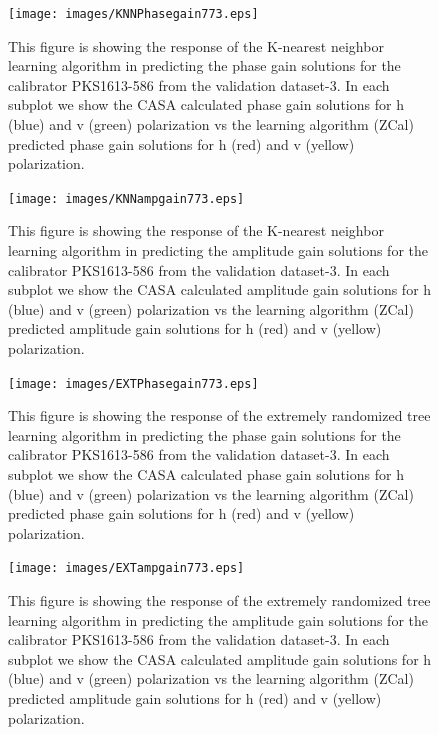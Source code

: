 \begin{figure}[H]
    \texttt{[image: images/KNNPhasegain773.eps]}
    \caption{This figure is showing the response of the K-nearest neighbor learning algorithm in predicting the phase gain solutions for the calibrator PKS1613-586 from the validation dataset-3. In each subplot we show the CASA calculated phase gain solutions for h (blue) and v (green) polarization vs the learning algorithm (ZCal) predicted phase gain solutions for h (red) and v (yellow) polarization.}
    \label{obs11}
\end{figure}

\begin{figure}[H]
    \texttt{[image: images/KNNampgain773.eps]}
    \caption{This figure is showing the response of the K-nearest neighbor learning algorithm in predicting the amplitude gain solutions for the calibrator PKS1613-586 from the validation dataset-3. In each subplot we show the CASA calculated amplitude gain solutions for h (blue) and v (green) polarization vs the learning algorithm (ZCal) predicted amplitude gain solutions for h (red) and v (yellow) polarization.}
     \label{ka3}
\end{figure}

\begin{figure}[H]
    \texttt{[image: images/EXTPhasegain773.eps]}
    \caption{This figure is showing the response of the extremely randomized tree learning algorithm in predicting the phase gain solutions for the calibrator PKS1613-586 from the validation dataset-3. In each subplot we show the CASA calculated phase gain solutions for h (blue) and v (green) polarization vs the learning algorithm (ZCal) predicted phase gain solutions for h (red) and v (yellow) polarization.}
    \label{obs12}
\end{figure}

\begin{figure}[H]
    \texttt{[image: images/EXTampgain773.eps]}
    \caption{This figure is showing the response of the extremely randomized tree learning algorithm in predicting the amplitude gain solutions for the calibrator PKS1613-586 from the validation dataset-3. In each subplot we show the CASA calculated amplitude gain solutions for h (blue) and v (green) polarization vs the learning algorithm (ZCal) predicted amplitude gain solutions for h (red) and v (yellow) polarization.}
     \label{ea3}
\end{figure}













